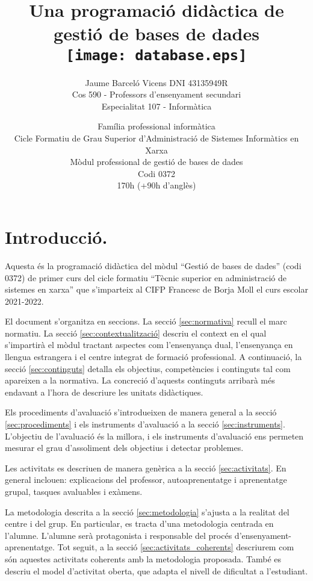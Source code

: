 \documentclass[catalan, a4paper, 12pt, titlepage]{article}
\title{Una programació didàctica de \\
gestió de bases de dades\\
	\texttt{[image: database.eps]}
	}
\author{
	Jaume Barceló Vicens
	DNI 43135949R\\
	Cos 590 - Professors d'ensenyament secundari\\
	Especialitat 107 - Informàtica}
\date{
	Família professional informàtica \\
	Cicle Formatiu de Grau Superior d’Administració de Sistemes Informàtics en Xarxa\\
	Mòdul professional de gestió de bases de dades\\
	Codi 0372 \\
	170h (+90h d'anglès)\\
	}
\begin{document}
\pagestyle{empty}

\maketitle

\tableofcontents 

\pagestyle{fancy}

\section{Introducció.}

Aquesta és la programació didàctica del mòdul ``Gestió de bases de dades'' (codi 0372) de primer curs del cicle formatiu ``Tècnic superior en administració de sistemes en xarxa'' que s'imparteix al CIFP Francesc de Borja Moll el curs escolar 2021-2022.

El document s'organitza en seccions. 
La secció \ref{sec:normativa} recull el marc normatiu.
La secció \ref{sec:contextualització} descriu el context en el qual s'impartirà el mòdul tractant aspectes com l'ensenyança dual, l'ensenyança en llengua estrangera i el centre integrat de formació professional.
A continuació, la secció \ref{sec:continguts} detalla els objectius, competències i continguts tal com apareixen a la normativa.
La concreció d'aquests continguts arribarà més endavant a l'hora de descriure les unitats didàctiques.

Els procediments d'avaluació s'introdueixen de manera general a la secció \ref{sec:procediments} i els instruments d'avaluació a la secció \ref{sec:instruments}.
L'objectiu de l'avaluació és la millora, i els instruments d'avaluació ens permeten mesurar el grau d'assoliment dels objectius i detectar problemes.

Les activitats es descriuen de manera genèrica a la secció \ref{sec:activitats}.
En general inclouen: explicacions del professor, autoaprenentatge i aprenentatge grupal, tasques avaluables i exàmens.

La metodologia descrita a la secció \ref{sec:metodologia} s'ajusta a la realitat del centre i del grup.
En particular, es tracta d'una metodologia centrada en l'alumne.
L'alumne serà protagonista i responsable del procés d'ensenyament-aprenentatge.
Tot seguit, a la secció \ref{sec:activitats_coherents} descriurem com són aquestes activitats coherents amb la metodologia proposada.
També es descriu el model d'activitat oberta, que adapta el nivell de dificultat a l'estudiant.
\end{document}
